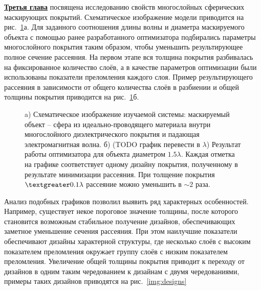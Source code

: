\underline{\textbf{Третья глава}} посвящена исследованию свойств
многослойных сферических маскирующих покрытий. Схематическое
изображение модели приводится на рис.~\ref{img:scattering}а. Для
заданного соотношения длины волны и диаметра маскируемого объекта с
помощью ранее разработанного оптимизатора подбирались параметры
многослойного покрытия таким образом, чтобы уменьшить результирующее
полное сечение рассеяния. На первом этапе вся толщина покрытия
разбивалась на фиксированное количество слоёв, а в качестве параметров
оптимизации были использованы показатели преломления каждого
слоя. Пример результирующего рассеяния в зависимости от общего
количества слоёв в разбиении и общей толщины покрытия приводится на
рис.~\ref{img:scattering}б.
\begin{figure}[t]
  \begin{minipage}[ht]{0.45\linewidth}
  \end{minipage}
  \hfill
  \begin{minipage}[ht]{0.54\linewidth}
  \end{minipage}
  \caption{a) Схематическое изображение изучаемой системы: маскируемый
    объект -- сфера из идеально-проводящего материала внутри
    многослойного диэлектрического покрытия и падающая
    электромагнитная волна. б) (TODO график перевести в $\lambda$)
    Результат работы оптимизатора для объекта диаметром
    $1.5\lambda$. Каждая отметка на графике соответствует одному
    дизайну покрытия, полученному в результате минимизации
    рассеяния. При толщение покрытия $\textgreater 0.1 \lambda$
    рассеяние можно уменьшить в $\sim 2$ раза.}
  \label{img:scattering}  
\end{figure}

Анализ подобных графиков позволил выявить ряд характерных
особенностей. Например, существует некое пороговое значение толщины,
после которого становится возможным стабильное получение дизайнов,
обеспечивающих заметное уменьшение сечения рассеяния. При этом
наилучшие показатели обеспечивают дизайны характерной структуры, где
несколько слоёв с высоким показателем преломления окружает группу
слоёв с низким показателем преломления. Увеличение общей толщины
покрытия приводит к переходу от дизайнов в одним таким чередованием к
дизайнам с двумя чередованиями, примеры таких дизайнов приводятся на
рис.~\ref{img:designs}

